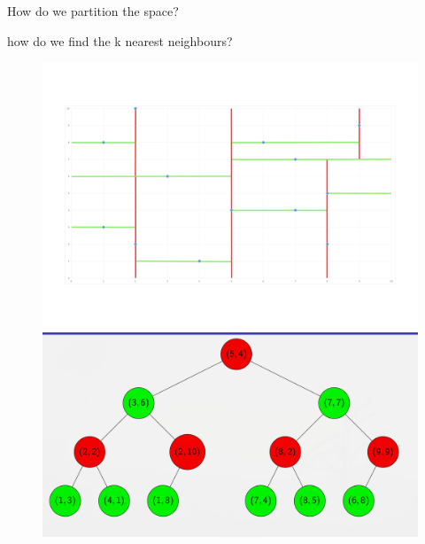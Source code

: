 \documentclass[11 pt]{beamer}
\begin{document}
\begin{frame}{How do we partition the space?}
\end{frame}
%
\begin{frame}{how do we find the k nearest neighbours?}
  \begin{figure}
  	\centering
  	\includegraphics[width=.45\textwidth]{figures/splitFin.png}
  	\includegraphics[width=.45\textwidth]{figures/tree.png}
  \end{figure}
\end{frame}
\end{document}
